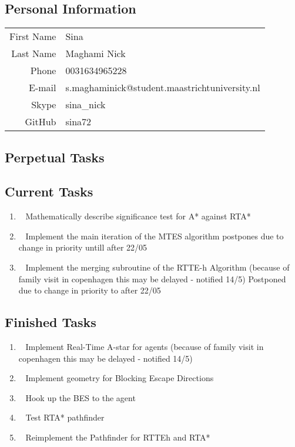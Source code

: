 \subsection{Personal Information}
\begin{table}[h!]
	\begin{tabular}{rl}
		First Name 	& Sina\\
		Last Name	& Maghami Nick\\
		Phone		& 0031634965228\\
		E-mail		& s.maghaminick@student.maastrichtuniversity.nl\\
		Skype		& sina\_nick\\
		GitHub		& sina72
	\end{tabular}
\end{table}

\subsection{Perpetual Tasks}

\subsection{Current Tasks}
\begin{enumerate}
	\item~
	Mathematically describe significance test for A* against RTA*
	\item~
	Implement the main iteration of the MTES algorithm
		\subitem postpones due to change in priority untill after 22/05
	\item~
	Implement the merging subroutine of the RTTE-h Algorithm
		\subitem (because of family visit in copenhagen this may be delayed - notified 14/5)
		\subitem Postponed due to change in priority to after 22/05
\end{enumerate}
\subsection{Finished Tasks}
\begin{enumerate}
	\item~
	Implement Real-Time A-star for agents
		\subitem (because of family visit in copenhagen this may be delayed - notified 14/5)
	\item~
		Implement geometry for Blocking Escape Directions
	\item~
		Hook up the BES to the agent
	\item~
		Test RTA* pathfinder
	\item~
		Reimplement the Pathfinder for RTTEh and RTA*
\end{enumerate}

